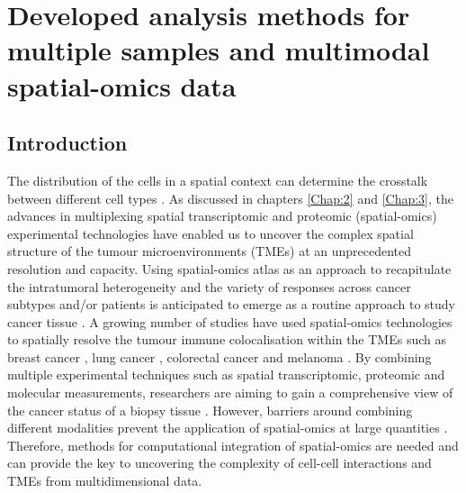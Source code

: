 \chapter[Developed analysis methods for multiple samples and multimodal spatial-omics data]{Developed analysis methods for multiple samples and multimodal spatial-omics data}

\label{Chap:4}	%
\pagestyle{headings}
\label{Sec:4.1_intro}	%
\section{Introduction}
The distribution of the cells in a spatial context can determine the crosstalk between different cell types \cite{van2018spatially}. As discussed in chapters \ref{Chap:2} and \ref{Chap:3}, the advances in multiplexing spatial transcriptomic and proteomic (spatial-omics) experimental technologies have enabled us to uncover the complex spatial structure of the tumour microenvironments (TMEs) at an unprecedented resolution and capacity. Using spatial-omics atlas as an approach to recapitulate the intratumoral heterogeneity and the variety of responses across cancer subtypes and/or patients is anticipated to emerge as a routine approach to study cancer tissue \cite{wu2022spatial,napoli2022functional,marsh2022approaches}. A growing number of studies have used spatial-omics technologies to spatially resolve the tumour immune colocalisation within the TMEs such as  breast cancer \cite{jackson2020single, ali2020imaging}, lung cancer \cite{sorin2023single}, colorectal cancer \cite{schurch2020coordinated, pelka2021spatially} and melanoma \cite{nirmal2022spatial}. By combining multiple experimental techniques such as spatial transcriptomic, proteomic and molecular measurements, researchers are aiming to gain a comprehensive view of the cancer status of a biopsy tissue \cite{boehm2022harnessing}. However, barriers around combining different modalities prevent the application of spatial-omics at large quantities \cite{wu2022spatial, vickovic2022sm}. Therefore, methods for computational integration of spatial-omics are needed and can provide the key to uncovering the complexity of cell-cell interactions and TMEs from multidimensional data.  
 
